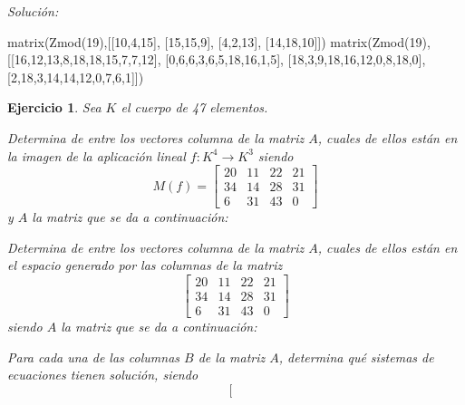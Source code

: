 \documentclass[12pt]{amsart}
\newtheorem{ejer}{Ejercicio}
\begin{document}
{\it Soluci\'on:}

\begin{sageblock}
matrix(Zmod(19),[[10,4,15],
[15,15,9],
[4,2,13],
[14,18,10]])
matrix(Zmod(19),[[16,12,13,8,18,18,15,7,7,12],
[0,6,6,3,6,5,18,16,1,5],
[18,3,9,18,16,12,0,8,18,0],
[2,18,3,14,14,12,0,7,6,1]])
\end{sageblock}



\begin{ejer} Sea $K$ el cuerpo de 47 elementos.
\newline
\noindent\begin{minipage}{\textwidth}
\begin{tcolorbox}[colback = green!20!white,title=Versión Núcleo]
Determina de entre los vectores columna de la matriz $A$, cuales de ellos están en la imagen de la aplicación lineal $f:K^{4} \to K^{3}$ siendo  $$ M(f) = \left[\begin{array}{rrrr}
20 & 11 & 22 & 21 \\
34 & 14 & 28 & 31 \\
6 & 31 & 43 & 0
\end{array}\right] $$ y $A$ la matriz que se da a continuación:\end{tcolorbox}
\end{minipage} \newline
\noindent\begin{minipage}{\textwidth}
\begin{tcolorbox}[colback = blue!20!white,title=Versión Anulador]
Determina de entre los vectores columna de la matriz $A$, cuales de ellos están en el espacio generado por las columnas de la matriz $$ \left[\begin{array}{rrrr}
20 & 11 & 22 & 21 \\
34 & 14 & 28 & 31 \\
6 & 31 & 43 & 0
\end{array}\right] $$ siendo $A$ la matriz que se da a continuación:\end{tcolorbox}
\end{minipage} \newline
\noindent\begin{minipage}{\textwidth} 
\begin{tcolorbox}[colback = red!20!white,title=Versión Ecuaciones Implícitas]
Para cada una de las columnas $B$ de la matriz $A$, determina qué sistemas de ecuaciones tienen solución, siendo $$ \left[\begin{array}{rrrr}

\end{array}$$
\end{tcolorbox}
\end{minipage}
\end{ejer}
\end{document}
